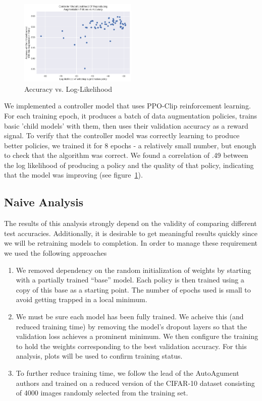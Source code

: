 \documentclass[10pt,twocolumn,letterpaper]{article}
\begin{document}
		\begin{figure}[h]		
			\begin{center}
				\includegraphics[width=0.5\textwidth]{ReducedAutoAugment.png}
			\end{center}
			\caption{Accuracy vs. Log-Likelihood}
			\label{fig:RAA}
		\end{figure}
		
		We implemented a controller model that uses PPO-Clip reinforcement learning. For each training epoch, it produces a batch of data augmentation policies, trains basic 'child models' with them, then uses their validation accuracy as a reward signal. To verify that the controller model was correctly learning to produce better policies, we trained it for 8 epochs - a relatively small number, but enough to check that the algorithm was correct. We found a correlation of .49 between the log likelihood of producing a policy and the quality of that policy, indicating that the model was improving (see figure~\ref{fig:RAA}).

	\subsection{Naive Analysis}
		The results of this analysis strongly depend on the validity of comparing different test accuracies. Additionally, it is desirable to get meaningful results quickly since we will be retraining models to completion. In order to manage these requirement we used the following approaches

		\begin{enumerate}
			\item 
				We removed dependency on the random initialization of weights by starting with a partially trained ``base'' model. Each policy is then trained using a copy of this base as a starting point. The number of epochs used is small to avoid getting trapped in a local minimum.
			\item 
				We must be sure each model has been fully trained. We acheive this (and reduced training time) by removing the model's dropout layers so that the validation loss achieves a prominent minimum. We then configure the training to hold the weights corresponding to the best validation accuracy. For this analysis, plots will be used to confirm training status.
			\item
				 To further reduce training time, we follow the lead of the AutoAgument authors and trained on a reduced version of the CIFAR-10 dataset consisting of 4000 images randomly selected from the training set.
		\end{enumerate}
\end{document}
